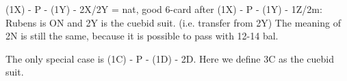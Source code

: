 (1X) - P - (1Y) - 2X/2Y = nat, good 6-card
after (1X) - P - (1Y) - 1Z/2m:
Rubens is ON and 2Y is the cuebid suit. (i.e. transfer from 2Y)
The meaning of 2N is still the same, because it is possible to pass with 12-14 bal.

The only special case is (1C) - P - (1D) - 2D. Here we define 3C as the cuebid suit.